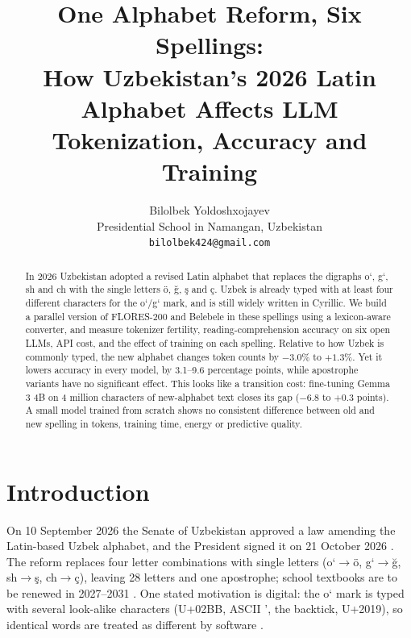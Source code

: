 \title{One Alphabet Reform, Six Spellings:\\
How Uzbekistan's 2026 Latin Alphabet Affects LLM Tokenization, Accuracy and Training}

\author{Bilolbek Yoldoshxojayev \\
  Presidential School in Namangan, Uzbekistan \\
  \texttt{bilolbek424@gmail.com}}

\maketitle

\begin{abstract}
In 2026 Uzbekistan adopted a revised Latin alphabet that replaces the digraphs o\textquoteleft, g\textquoteleft, sh and ch with the single letters \"o, \u{g}, \c{s} and \c{c}. Uzbek is already typed with at least four different characters for the o\textquoteleft/g\textquoteleft{} mark, and is still widely written in Cyrillic. We build a parallel version of FLORES-200 and Belebele in these spellings using a lexicon-aware converter, and measure tokenizer fertility, reading-comprehension accuracy on six open LLMs, API cost, and the effect of training on each spelling. Relative to how Uzbek is commonly typed, the new alphabet changes token counts by $-3.0\%$ to $+1.3\%$. Yet it lowers accuracy in every model, by 3.1--9.6 percentage points, while apostrophe variants have no significant effect. This looks like a transition cost: fine-tuning Gemma 3 4B on 4 million characters of new-alphabet text closes its gap ($-6.8$ to $+0.3$ points). A small model trained from scratch shows no consistent difference between old and new spelling in tokens, training time, energy or predictive quality.
\end{abstract}

\section{Introduction}
On 10 September 2026 the Senate of Uzbekistan approved a law amending the Latin-based Uzbek alphabet, and the President signed it on 21 October 2026 \citep{legalalliance2026, gazeta2026}. The reform replaces four letter combinations with single letters (o\textquoteleft$\to$\"o, g\textquoteleft$\to$\u{g}, sh$\to$\c{s}, ch$\to$\c{c}), leaving 28 letters and one apostrophe; school textbooks are to be renewed in 2027--2031 \citep{legalalliance2026}. One stated motivation is digital: the o\textquoteleft{} mark is typed with several look-alike characters (U+02BB, ASCII ', the backtick, U+2019), so identical words are treated as different by software \citep{legalalliance2026}.

